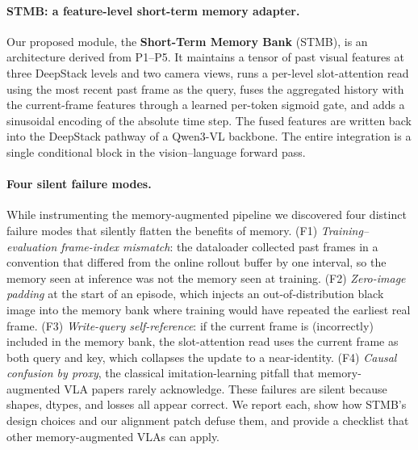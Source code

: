 \documentclass[11pt]{article}
\begin{document}
\paragraph{STMB: a feature-level short-term memory adapter.}
Our proposed module, the \textbf{Short-Term Memory Bank} (STMB), is an
architecture derived from P1--P5. It maintains a tensor of past visual features at
three DeepStack levels and two camera views, runs a per-level slot-attention read
using the most recent past frame as the query, fuses the aggregated history with
the current-frame features through a learned per-token sigmoid gate, and adds a
sinusoidal encoding of the absolute time step. The fused features are written
back into the DeepStack pathway of a Qwen3-VL backbone. The entire integration
is a single conditional block in the vision--language forward pass.

\paragraph{Four silent failure modes.}
While instrumenting the memory-augmented pipeline we discovered four distinct
failure modes that silently flatten the benefits of memory. (F1)
\emph{Training--evaluation frame-index mismatch}: the dataloader collected past
frames in a convention that differed from the online rollout buffer by one
interval, so the memory seen at inference was not the memory seen at training.
(F2) \emph{Zero-image padding} at the start of an episode, which injects an
out-of-distribution black image into the memory bank where training would have
repeated the earliest real frame. (F3) \emph{Write-query self-reference}: if the
current frame is (incorrectly) included in the memory bank, the slot-attention
read uses the current frame as both query and key, which collapses the update to
a near-identity. (F4) \emph{Causal confusion by proxy}, the classical
imitation-learning pitfall that memory-augmented VLA papers rarely acknowledge.
These failures are silent because shapes, dtypes, and losses all appear correct.
We report each, show how STMB's design choices and our alignment patch defuse
them, and provide a checklist that other memory-augmented VLAs can apply.
\end{document}
